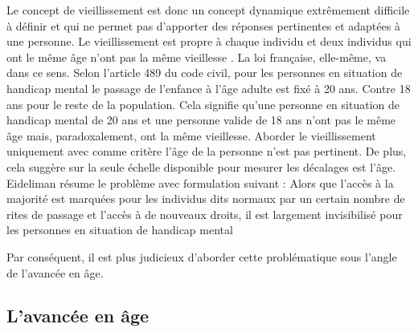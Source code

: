 Le concept de vieillissement est donc un concept dynamique extrêmement difficile à définir et qui ne permet pas d'apporter des réponses pertinentes et adaptées à une personne. Le vieillissement est propre à chaque individu et deux individus qui ont le même âge n'ont pas la même \og vieillesse \fg{}.
La loi française, elle-même, va dans ce sens. Selon l'article 489 du code civil, pour les personnes en situation de handicap mental le passage de l'enfance à l'âge adulte est fixé à 20 ans. Contre 18 ans pour le reste de la population. Cela signifie qu'une personne en situation de handicap mental de 20 ans et une personne valide de 18 ans n'ont pas le même âge mais, paradoxalement, ont la même vieillesse. Aborder le vieillissement uniquement avec comme critère l'âge de la personne n'est pas pertinent. De plus, cela suggère sur la seule échelle disponible pour mesurer les décalages est l’âge.
Eideliman résume le problème avec formulation suivant : \og Alors que l’accès à la majorité est marquées pour les individus dits normaux par un certain nombre de rites de passage et l’accès à de nouveaux droits, il est largement invisibilisé pour les personnes en situation de handicap mental\fg{}

Par conséquent, il est plus judicieux d'aborder cette problématique sous l'angle de l'avancée en âge.

\subsection{L'avancée en âge}

